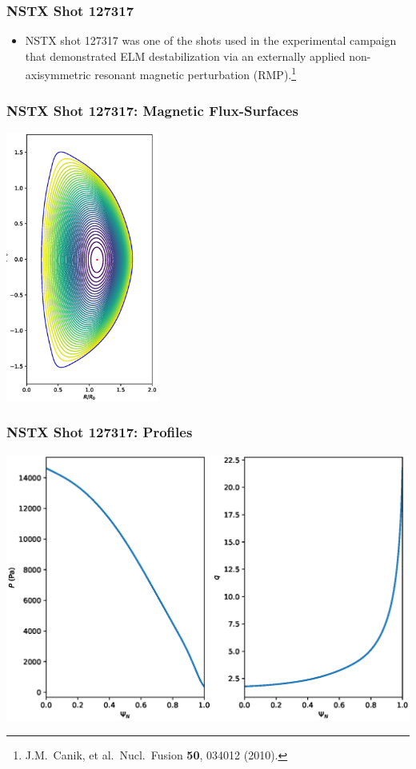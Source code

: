 \documentclass{beamer}
\begin{document}
\begin{frame}
\frametitle{NSTX Shot 127317}
 
\begin{itemize}
\item NSTX shot 127317 was one of the shots used in the experimental campaign  that demonstrated  ELM destabilization via an externally applied non-axisymmetric
resonant magnetic perturbation (RMP).\footnote{J.M.~Canik, et al.\ Nucl.\ Fusion {\bf 50}, 034012 (2010).}
\end{itemize}
\end{frame}

\begin{frame}
\frametitle{NSTX Shot 127317: Magnetic Flux-Surfaces}

\begin{center}
\includegraphics[height=3.5in]{Equilibrium.eps}
\end{center}

\end{frame}

\begin{frame}
\frametitle{NSTX Shot 127317: Profiles}

\begin{center}
\includegraphics[width=\textwidth]{Profiles.eps}
\end{center}

\end{frame}
\end{document}
